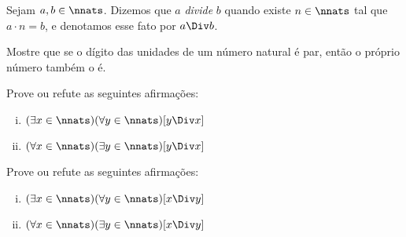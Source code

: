 \begin{definition}
Sejam $a,b \in \nnats$. Dizemos que $a$ \textit{divide} $b$ quando existe $n \in \nnats$ tal que $a \cdot n = b$, e denotamos esse fato por $a \Div b$.
\end{definition}

\begin{exercise}
%
Mostre que se o dígito das unidades de um número natural é par, então o próprio número também o é.
\end{exercise}

\begin{exercise}
%
Prove ou refute as seguintes afirmações:

\begin{enumerate}[(i)]
\item $(\exists x \in \nnats)( \forall y \in \nnats)[ y \Div x]$
\item $(\forall x \in \nnats)( \exists y \in \nnats)[ y \Div x]$
\end{enumerate}

\begin{homework}
%
Prove ou refute as seguintes afirmações:
\begin{enumerate}[(i)]
\item $(\exists x \in \nnats)( \forall y \in \nnats)[ x \Div y]$
\item $(\forall x \in \nnats)( \exists y \in \nnats)[ x \Div y]$
\end{enumerate}
\end{homework}

\end{exercise}